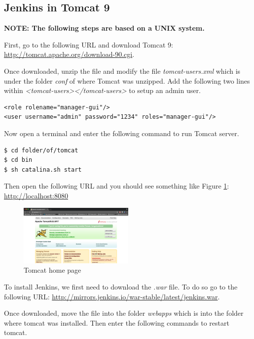 \subsection{Jenkins in Tomcat 9}
\textbf{NOTE: The following steps are based on a UNIX system.}

First, go to the following URL and download Tomcat 9: \url{http://tomcat.apache.org/download-90.cgi}.

Once downloaded, unzip the file and modify the file \emph{tomcat-users.xml} which is under the folder \emph{conf} of where Tomcat was unzipped. Add the following two lines within \emph{<tomcat-users></tomcat-users>} to setup an admin user.

\begin{verbatim}
<role rolename="manager-gui"/>
<user username="admin" password="1234" roles="manager-gui"/>
\end{verbatim}

Now open a terminal and enter the following command to run Tomcat server.

\begin{verbatim}
$ cd folder/of/tomcat
$ cd bin
$ sh catalina.sh start
\end{verbatim}

Then open the following URL and you should see something like Figure \ref{fig:tomcat-01}: \url{http://localhost:8080}

\begin{figure}[H]
	\centering
    \includegraphics[width=0.5\textwidth]{grafiken/tomcat-01}
    \caption{Tomcat home page}
    \label{fig:tomcat-01}
\end{figure}

To install Jenkins, we first need to download the \emph{.war} file. To do so go to the following URL: \url{http://mirrors.jenkins.io/war-stable/latest/jenkins.war}.

Once downloaded, move the file into the folder \emph{webapps} which is into the folder where tomcat was installed. Then enter the following commands to restart tomcat.

